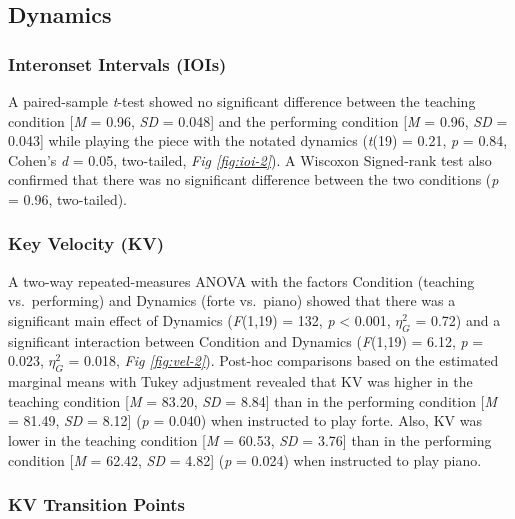 \documentclass[
  english,
  man,floatsintext]{apa6}
\begin{document}
\hypertarget{dynamics-1}{%
\subsection{Dynamics}\label{dynamics-1}}

\hypertarget{interonset-intervals-iois-3}{%
\subsubsection{Interonset Intervals (IOIs)}\label{interonset-intervals-iois-3}}

A paired-sample \emph{t}-test showed no significant difference between the teaching condition {[}\emph{M} = 0.96, \emph{SD} = 0.048{]} and the performing condition {[}\emph{M} = 0.96, \emph{SD} = 0.043{]} while playing the piece with the notated dynamics (\emph{t}(19) = 0.21, \emph{p} = 0.84, Cohen's \emph{d} = 0.05, two-tailed, \emph{Fig \ref{fig:ioi-2}}). A Wiscoxon Signed-rank test also confirmed that there was no significant difference between the two conditions (\emph{p} = 0.96, two-tailed).

\hypertarget{key-velocity-kv-3}{%
\subsubsection{Key Velocity (KV)}\label{key-velocity-kv-3}}

A two-way repeated-measures ANOVA with the factors Condition (teaching vs.~performing) and Dynamics (forte vs.~piano) showed that there was a significant main effect of Dynamics (\emph{F}(1,19) = 132, \emph{p} \textless{} 0.001, \(\eta_G^2\) = 0.72) and a significant interaction between Condition and Dynamics (\emph{F}(1,19) = 6.12, \emph{p} = 0.023, \(\eta_G^2\) = 0.018, \emph{Fig \ref{fig:vel-2}}). Post-hoc comparisons based on the estimated marginal means with Tukey adjustment revealed that KV was higher in the teaching condition {[}\emph{M} = 83.20, \emph{SD} = 8.84{]} than in the performing condition {[}\emph{M} = 81.49, \emph{SD} = 8.12{]} (\emph{p} = 0.040) when instructed to play forte. Also, KV was lower in the teaching condition {[}\emph{M} = 60.53, \emph{SD} = 3.76{]} than in the performing condition {[}\emph{M} = 62.42, \emph{SD} = 4.82{]} (\emph{p} = 0.024) when instructed to play piano.

\hypertarget{kv-transition-points-1}{%
\subsubsection{KV Transition Points}\label{kv-transition-points-1}}
\end{document}
